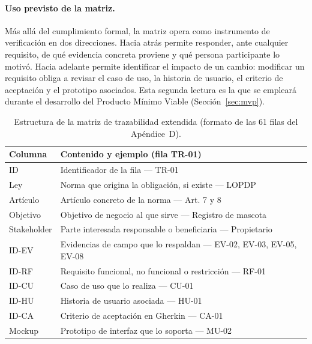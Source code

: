 \documentclass[journal,onecolumn]{IEEEtran}
\begin{document}
	\paragraph{Uso previsto de la matriz.}
	Más allá del cumplimiento formal, la matriz opera como instrumento de
	verificación en dos direcciones. Hacia atrás permite responder, ante
	cualquier requisito, de qué evidencia concreta proviene y qué persona
	participante lo motivó. Hacia adelante permite identificar el impacto de un
	cambio: modificar un requisito obliga a revisar el caso de uso, la historia
	de usuario, el criterio de aceptación y el prototipo asociados. Esta segunda
	lectura es la que se empleará durante el desarrollo del Producto Mínimo
	Viable (Sección~\ref{sec:mvp}).
	
	\begin{table}[H]
		\centering
		\caption{Estructura de la matriz de trazabilidad extendida (formato de las 61 filas del Apéndice~D).}
		\label{tab:trazabilidad}
		\small
		\begin{tabularx}{\textwidth}{@{}l X@{}}
			\toprule
			\textbf{Columna} & \textbf{Contenido y ejemplo (fila TR-01)} \\
			\midrule
			ID & Identificador de la fila --- TR-01 \\
			Ley & Norma que origina la obligación, si existe --- LOPDP \\
			Artículo & Artículo concreto de la norma --- Art. 7 y 8 \\
			Objetivo & Objetivo de negocio al que sirve --- Registro de mascota \\
			Stakeholder & Parte interesada responsable o beneficiaria --- Propietario \\
			ID-EV & Evidencias de campo que lo respaldan --- EV-02, EV-03, EV-05, EV-08 \\
			ID-RF & Requisito funcional, no funcional o restricción --- RF-01 \\
			ID-CU & Caso de uso que lo realiza --- CU-01 \\
			ID-HU & Historia de usuario asociada --- HU-01 \\
			ID-CA & Criterio de aceptación en Gherkin --- CA-01 \\
			Mockup & Prototipo de interfaz que lo soporta --- MU-02 \\
			\bottomrule
		\end{tabularx}
	\end{table}
	
\end{document}
